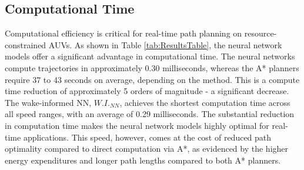 \documentclass[final,5p,times,twocolumn]{elsarticle}
\begin{document}
\subsection{Computational Time} %

Computational efficiency is critical for real-time path planning on resource-constrained AUVs. As shown in Table \ref{tab:ResultsTable}, the neural network models offer a significant advantage in computational time. The neural networks compute trajectories in approximately 0.30 milliseconds, whereas the A* planners require 37 to 43 seconds on average, depending on the method. This is a compute time reduction of approximately 5 orders of magnitude - a significant decrease. The wake-informed NN, $W.I._{NN}$, achieves the shortest computation time across all speed ranges, with an average of 0.29 milliseconds. The substantial reduction in computation time makes the neural network models highly optimal for real-time applications. This speed, however, comes at the cost of reduced path optimality compared to direct computation via A*, as evidenced by the higher energy expenditures and longer path lengths compared to both A* planners.
\end{document}
